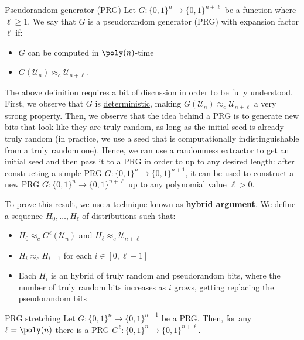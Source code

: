 \documentclass[a4paper, 12pt]{report}
\begin{document}
    \begin{frameddefn}{Pseudorandom generator (PRG)}
        Let $G : \{0,1\}^n \to \{0,1\}^{n+\ell}$ be a function where $\ell \geq 1$. We say that $G$ is a pseudorandom generator (PRG) with expansion factor $\ell$ if:
        \begin{itemize}
            \item $G$ can be computed in $\poly(n)$-time
            \item $G(\mathcal{U}_n) \approx_c \mathcal{U}_{n+\ell}$.
        \end{itemize}
    \end{frameddefn}

    The above definition requires a bit of discussion in order to be fully understood. First, we observe that $G$ is \underline{deterministic}, making $G(\mathcal{U}_n) \approx_c \mathcal{U}_{n+\ell}$ a very strong property. Then, we observe that the idea behind a PRG is to generate new bits that look like they are truly random, as long as the initial seed is already truly random (in practice, we use a seed that is computationally indistinguishable from a truly random one). Hence, we can use a randomness extractor to get an initial seed and then pass it to a PRG in order to  up to any desired length: after constructing a simple PRG $G : \{0,1\}^n \to \{0,1\}^{n+1}$, it can be used to construct a new PRG $G : \{0,1\}^n \to \{0,1\}^{n+\ell}$ up to any polynomial value $\ell > 0$.

    To prove this result, we use a technique known as \textbf{hybrid argument}. We define a sequence $H_0, \ldots, H_\ell$ of distributions such that:
    \begin{itemize}
        \item $H_0 \approx_c G^\ell(\mathcal{U}_n)$ and $H_\ell \approx_c \mathcal{U}_{n+\ell}$
        \item $H_i \approx_c H_{i+1}$ for each $i \in [0, \ell-1]$
        \item Each $H_i$ is an hybrid of truly random and pseudorandom bits, where the number of truly random bits increases as $i$ grows, getting replacing the pseudorandom bits
    \end{itemize}

    \begin{framedthm}{PRG stretching}
        Let $G : \{0,1\}^n \to \{0,1\}^{n+1}$ be a PRG. Then, for any $\ell = \poly(n)$ there is a PRG $G^\ell : \{0,1\}^n \to \{0,1\}^{n+\ell}$.
    \end{framedthm}
\end{document}
